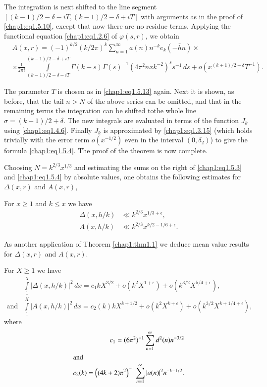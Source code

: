 The integration is next shifted to the line segment
$[(k-1)/2-\delta-iT, (k-1)/2-\delta+iT]$ with arguments as
in the proof of \eqref{chap1:eq1.5.10}, except that now there are no
residue terms. Applying the functional equation \eqref{chap1:eq1.2.6}
of $\varphi(s,r)$, we obtain
\begin{align*}
& A(x,r)=(-1)^{k/2}(k/2\pi)^k \sum\limits_{n=1}^\infty
a(n)n^{-k}e_k(-\bar{h}n)\times\\
& \times \frac{1}{2\pi i}
\int\limits_{(k-1)/2-\delta-iT}^{(k-1)/2-\delta+iT} 
\Gamma(k-s)\Gamma(s)^{-1}(4\pi^2nxk^{-2})^ss^{-1}\,ds+o
(x^{(k+1)/2+\delta}T^{-1}).
\end{align*}

The parameter $T$ is chosen as in \eqref{chap1:eq1.5.13} again. Next
it is shown, as before, that the tail $n>N$ of the above series can be
omitted, and that in the remaining terms the integration can be
shifted to\pageoriginale the whole line
$\sigma=(k-1)/2+\delta$. The new integrals are evaluated in terms
of the function $J_k$ using \eqref{chap1:eq1.4.6}. Finally $J_k$
is approximated by \eqref{chap1:eq1.3.15} (which holds trivially with
the error term $o(x^{-1/2})$ even in the interval $(0, \delta_2)$) to
give the formula \eqref{chap1:eq1.5.4}. The proof of the theorem is
now complete.

Choosing $N=k^{2/3}x^{1/3}$ and estimating the sums on the right of
\eqref{chap1:eq1.5.3} and \eqref{chap1:eq1.5.4} by absolute values,
one obtains the following estimates for $\Delta(x,r)$ and $A(x,r)$, 
\begin{Coro*}
For $x\geq 1$ and $k\leq x$ we have 
\begin{align}
\Delta(x,h/k) & \ll k^{2/3}x^{1/3+\epsilon},\label{chap1:eq1.5.20}\\
A(x,h/k) & \ll k^{2/3}x^{k/2-1/6+\epsilon}.\label{chap1:eq1.5.21}
\end{align}
\end{Coro*}

As another application of Theorem \ref{chap1:thm1.1} we deduce mean
value results for $\Delta(x,r)$ and $A(x,r)$. 
\begin{THM}\label{chap1:thm1.2}
For $X\geq 1$ we have 
\begin{align}
& \int\limits_1^X|\Delta(x,h/k)|^2\,dx=c_1kX^{3/2}+o(k^2X^{1+\epsilon})
+o(k^{3/2}X^{5/4+\epsilon}),\label{chap1:eq1.5.22}\\
\text{and}
& \int\limits_1^X|A(x,h/k)|^2\,dx=c_2(k)kX^{k+1/2}+o(k^2
X^{k+\epsilon})+o(k^{3/2}X^{k+1/4+\epsilon}),\label{chap1:eq1.5.23}
\end{align}
where
\begin{equation*}
\begin{split}
c_1=(6\pi^2)^{-1}\sum\limits_{n=1}^\infty d^2(n)n^{-3/2}\\
\intertext{and}
c_2(k)=\left((4k+2)\pi^2\right)^{-1}
\sum\limits_{n=1}^\infty |a(n)|^2n^{-k-1/2}.
\end{split}
\end{equation*}
\end{THM}

